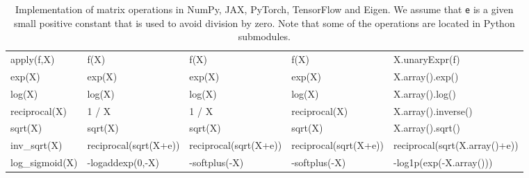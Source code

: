 \documentclass[twoside,11pt]{article}
\begin{document}
\begin{table}[h]
\begin{tabular}{ p{2.2cm}|p{2.6cm}p{2.6cm}p{2.6cm}p{3.6cm} }
\textsf{apply(f,X)}            & \textsf{f(X)}                   & \textsf{f(X)}                    & \textsf{f(X)}                        & \textsf{X.unaryExpr(f)}                  \\
\textsf{exp(X)}                & \textsf{exp(X)}                 & \textsf{exp(X)}                  & \textsf{exp(X)}                      & \textsf{X.array().exp()}                 \\
\textsf{log(X)}                & \textsf{log(X)}                 & \textsf{log(X)}                  & \textsf{log(X)}                      & \textsf{X.array().log()}                 \\
\textsf{reciprocal(X)}         & \textsf{1 / X}                  & \textsf{1 / X}                   & \textsf{reciprocal(X)}               & \textsf{X.array().inverse()}             \\
\textsf{sqrt(X)}               & \textsf{sqrt(X)}                & \textsf{sqrt(X)}                 & \textsf{sqrt(X)}                     & \textsf{X.array().sqrt()}                \\
\textsf{inv\_sqrt(X)} & \textsf{reciprocal(sqrt(X+e))}  & \textsf{reciprocal(sqrt(X+e))}   & \textsf{reciprocal(sqrt(X+e))}       & \textsf{reciprocal(sqrt(X.array()+e))}   \\
\textsf{log\_sigmoid(X)}       & \textsf{-logaddexp(0,-X)}       & \textsf{-softplus(-X)}           & \textsf{-softplus(-X)}               & \textsf{-log1p(exp(-X.array()))}         \\
 \bottomrule
\end{tabular}
\vspace{.8em}
\caption{Implementation of matrix operations in NumPy, JAX, PyTorch, TensorFlow and Eigen.
We assume that \texttt{e} is a given small positive constant that is used to avoid division by zero.
Note that some of the operations are located in Python submodules.
}
\label{table:matrix-operations-implementation}
\end{table}
\end{document}
